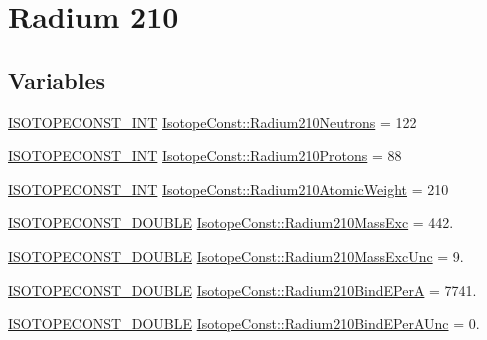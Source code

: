 \hypertarget{group___isotope_const-_radium-_ra210}{}\section{Radium 210}
\label{group___isotope_const-_radium-_ra210}
\subsection*{Variables}
\begin{DoxyCompactItemize}
\item 
\mbox{\hyperlink{group___isotope_const-_macros_ga5f18360b3e99483a35c32d789e62621c}{I\+S\+O\+T\+O\+P\+E\+C\+O\+N\+S\+T\+\_\+\+I\+NT}} \mbox{\hyperlink{group___isotope_const-_radium-_ra210_gaae61fcaf9fe94a4231075b4079516f09}{Isotope\+Const\+::\+Radium210\+Neutrons}} = 122
\item 
\mbox{\hyperlink{group___isotope_const-_macros_ga5f18360b3e99483a35c32d789e62621c}{I\+S\+O\+T\+O\+P\+E\+C\+O\+N\+S\+T\+\_\+\+I\+NT}} \mbox{\hyperlink{group___isotope_const-_radium-_ra210_gaff089b018f84612784e62253a98c7636}{Isotope\+Const\+::\+Radium210\+Protons}} = 88
\item 
\mbox{\hyperlink{group___isotope_const-_macros_ga5f18360b3e99483a35c32d789e62621c}{I\+S\+O\+T\+O\+P\+E\+C\+O\+N\+S\+T\+\_\+\+I\+NT}} \mbox{\hyperlink{group___isotope_const-_radium-_ra210_gac0007c78165f86c23ccc82b24611270a}{Isotope\+Const\+::\+Radium210\+Atomic\+Weight}} = 210
\item 
\mbox{\hyperlink{group___isotope_const-_macros_ga8f45a7272ce02c0b4c65c44636ed719a}{I\+S\+O\+T\+O\+P\+E\+C\+O\+N\+S\+T\+\_\+\+D\+O\+U\+B\+LE}} \mbox{\hyperlink{group___isotope_const-_radium-_ra210_ga8bbc6cb49d94236f374951d7a6760972}{Isotope\+Const\+::\+Radium210\+Mass\+Exc}} = 442.
\item 
\mbox{\hyperlink{group___isotope_const-_macros_ga8f45a7272ce02c0b4c65c44636ed719a}{I\+S\+O\+T\+O\+P\+E\+C\+O\+N\+S\+T\+\_\+\+D\+O\+U\+B\+LE}} \mbox{\hyperlink{group___isotope_const-_radium-_ra210_ga7f6dfba1d4aa3ed5e05c0332de44e182}{Isotope\+Const\+::\+Radium210\+Mass\+Exc\+Unc}} = 9.
\item 
\mbox{\hyperlink{group___isotope_const-_macros_ga8f45a7272ce02c0b4c65c44636ed719a}{I\+S\+O\+T\+O\+P\+E\+C\+O\+N\+S\+T\+\_\+\+D\+O\+U\+B\+LE}} \mbox{\hyperlink{group___isotope_const-_radium-_ra210_ga85634214dd2c5f3da9906935fc3c577a}{Isotope\+Const\+::\+Radium210\+Bind\+E\+PerA}} = 7741.
\item 
\mbox{\hyperlink{group___isotope_const-_macros_ga8f45a7272ce02c0b4c65c44636ed719a}{I\+S\+O\+T\+O\+P\+E\+C\+O\+N\+S\+T\+\_\+\+D\+O\+U\+B\+LE}} \mbox{\hyperlink{group___isotope_const-_radium-_ra210_ga2eca00a077dc29a51e694d9b4ff70824}{Isotope\+Const\+::\+Radium210\+Bind\+E\+Per\+A\+Unc}} = 0.

\end{DoxyCompactItemize}
